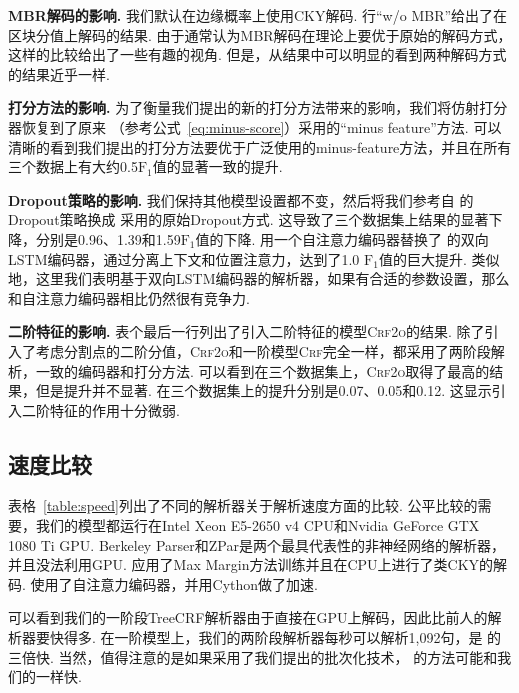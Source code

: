 \noindent\textbf{MBR解码的影响.}
我们默认在边缘概率上使用CKY解码.
行``w/o MBR''给出了在区块分值上解码的结果.
由于通常认为MBR解码在理论上要优于原始的解码方式，这样的比较给出了一些有趣的视角.
但是，从结果中可以明显的看到两种解码方式的结果近乎一样.

\noindent\textbf{打分方法的影响.}
为了衡量我们提出的新的打分方法带来的影响，我们将仿射打分器恢复到了原来 \citep{stern-etal-2017-minimal}（参考公式~\ref{eq:minus-score}）采用的``minus feature''方法.
可以清晰的看到我们提出的打分方法要优于广泛使用的minus-feature方法，并且在所有三个数据上有大约0.5$\mathrm{F}_1$值的显著一致的提升.

\noindent\textbf{Dropout策略的影响.}
我们保持其他模型设置都不变，然后将我们参考自 \citep{dozat-etal-2017-biaffine}的Dropout策略换成 \citep{stern-etal-2017-minimal}采用的原始Dropout方式.
这导致了三个数据集上结果的显著下降，分别是0.96、1.39和1.59$\mathrm{F}_1$值的下降.
\citep{kitaev-klein-2018-constituency}用一个自注意力编码器替换了 \citep{stern-etal-2017-minimal}的双向LSTM编码器，通过分离上下文和位置注意力，达到了1.0 $\mathrm{F}_1$值的巨大提升.
类似地，这里我们表明基于双向LSTM编码器的解析器，如果有合适的参数设置，那么和自注意力编码器相比仍然很有竞争力.

\noindent\textbf{二阶特征的影响.}
表个最后一行列出了引入二阶特征的模型\textsc{Crf2o}的结果.
除了引入了考虑分割点的二阶分值，\textsc{Crf2o}和一阶模型\textsc{Crf}完全一样，都采用了两阶段解析，一致的编码器和打分方法.
可以看到在三个数据集上，\textsc{Crf2o}取得了最高的结果，但是提升并不显著.
在三个数据集上的提升分别是0.07、0.05和0.12.
这显示引入二阶特征的作用十分微弱.



\subsection{速度比较}
表格~\ref{table:speed}列出了不同的解析器关于解析速度方面的比较.
公平比较的需要，我们的模型都运行在Intel Xeon E5-2650 v4 CPU和Nvidia GeForce GTX 1080 Ti GPU.
Berkeley Parser和ZPar是两个最具代表性的非神经网络的解析器，并且没法利用GPU.
\citep{stern-etal-2017-minimal}应用了Max Margin方法训练并且在CPU上进行了类CKY的解码.
\citep{kitaev-klein-2018-constituency}使用了自注意力编码器，并用Cython做了加速.

可以看到我们的一阶段TreeCRF解析器由于直接在GPU上解码，因此比前人的解析器要快得多.
在一阶模型上，我们的两阶段解析器每秒可以解析1,092句，是 \citep{kitaev-klein-2018-constituency}的三倍快.
当然，值得注意的是如果采用了我们提出的批次化技术， \citep{stern-etal-2017-minimal,kitaev-klein-2018-constituency}的方法可能和我们的一样快.

